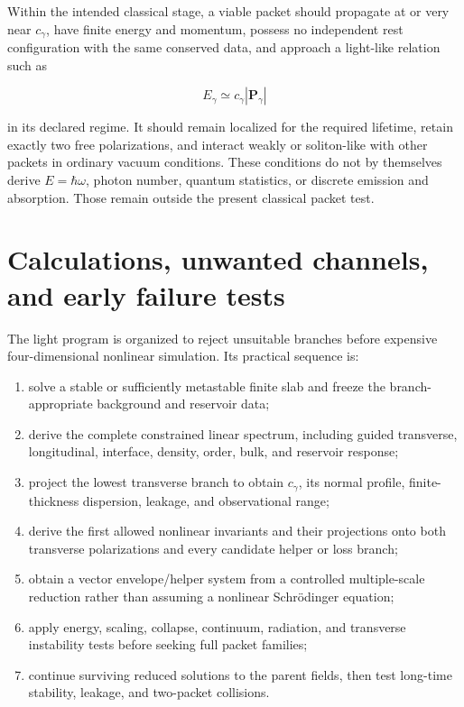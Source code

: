 Within the intended classical stage, a viable packet should propagate at or
very near \(c_\gamma\), have finite energy and momentum, possess no independent
rest configuration with the same conserved data, and approach a light-like
relation such as

\[
E_\gamma\simeq c_\gamma|\mathbf P_\gamma|
\]

in its declared regime. It should remain localized for the required lifetime,
retain exactly two free polarizations, and interact weakly or soliton-like with
other packets in ordinary vacuum conditions. These conditions do not by
themselves derive \(E=\hbar\omega\), photon number, quantum statistics, or
discrete emission and absorption. Those remain outside the present classical
packet test.

\section{Calculations, unwanted channels, and early failure tests}

The light program is organized to reject unsuitable branches before expensive
four-dimensional nonlinear simulation. Its practical sequence is:

\begin{enumerate}[leftmargin=2.2em,itemsep=0.42em]
  \item solve a stable or sufficiently metastable finite slab and freeze the
        branch-appropriate background and reservoir data;
  \item derive the complete constrained linear spectrum, including guided
        transverse, longitudinal, interface, density, order, bulk, and
        reservoir response;
  \item project the lowest transverse branch to obtain \(c_\gamma\), its normal
        profile, finite-thickness dispersion, leakage, and observational range;
  \item derive the first allowed nonlinear invariants and their projections
        onto both transverse polarizations and every candidate helper or loss
        branch;
  \item obtain a vector envelope/helper system from a controlled multiple-scale
        reduction rather than assuming a nonlinear Schrödinger equation;
  \item apply energy, scaling, collapse, continuum, radiation, and transverse
        instability tests before seeking full packet families;
  \item continue surviving reduced solutions to the parent fields, then test
        long-time stability, leakage, and two-packet collisions.
\end{enumerate}

